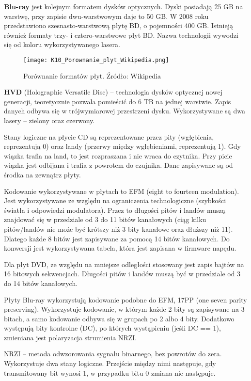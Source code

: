 \textbf{Blu-ray} jest kolejnym formatem dysków optycznych. Dyski posiadają 25 GB na warstwę, przy zapisie dwu-warstwowym daje to 50 GB. W 2008 roku przedstawiono szesnasto-warstwową płytę BD, o pojemności 400 GB. Istnieją również formaty trzy- i cztero-warstwowe płyt BD. Nazwa technologii wywodzi się od koloru wykorzystywanego lasera. 

\begin{figure}[H]
\caption{Porównanie formatów płyt. Źródło: Wikipedia}
\centering
\texttt{[image: K10\_Porownanie\_plyt\_Wikipedia.png]}
\end{figure}

\textbf{HVD} (Holographic Versatile Disc) -- technologia dysków optycznej nowej generacji, teoretycznie pozwala pomieścić do 6 TB na jednej warstwie. Zapis danych odbywa się w trójwymiarowej przestrzeni dysku. Wykorzystywane są dwa lasery -- zielony oraz czerwony.

Stany logiczne na płycie CD są reprezentowane przez pity (wgłębienia, reprezentują 0) oraz landy (przerwy między wgłębieniami, reprezentują 1). Gdy wiązka trafia na land, to jest rozpraszana i nie wraca do czytnika. Przy picie wiązka jest odbijana i trafia z powrotem do czujnika. Dane zapisywane są od środka na zewnątrz płyty.

Kodowanie wykorzystywane w płytach to EFM (eight to fourteen modulation). Jest wykorzystywane ze względu na ograniczenia technologiczne (szybkości światła i odpowiedzi modulatora). Przez to długości pitów i landów muszą znajdować się w przedziale od 3 do 11 bitów kanałowych (ciąg kilku pitów/landów nie może być krótszy niż 3 bity kanałowe oraz dłuższy niż 11). Dlatego każde 8 bitów jest zapisywane za pomocą 14 bitów kanałowych. Do konwersji jest wykorzystywana tabela, która jest zapisana w firmware napędu. 

Dla płyt DVD, ze względu na mniejsze odległości stosowany jest zapis bajtów na 16 bitowych sekwencjach. Długości pitów i landów muszą być w przedziale od 3 do 14 bitów kanałowych.

Płyty Blu-ray wykorzystują kodowanie podobne do EFM, 17PP (one seven parity preserving). Wykorzystuje kodowanie, w którym każde 2 bity są zapisywane na 3 bitach, a samo kodowanie odbywa się w grupach po 2 albo 4 bity. Dodatkowo występują bity kontrolne (DC), po których wystąpieniu (jeśli DC == 1), zmieniana jest polaryzacja strumienia NRZI.

NRZI -- metoda odwzorowania sygnału binarnego, bez powrotów do zera. Wykorzystuje dwa stany logiczne. Przejście między nimi następuje, gdy transmitowany bit wynosi 1, w przypadku bitu 0 zmiana nie następuje.

